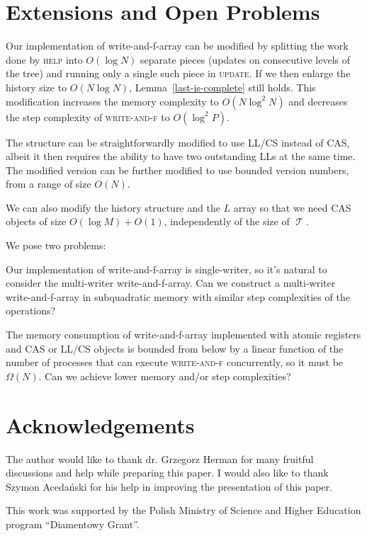 \documentclass[a4paper,11pt]{article}
\def\T{\ensuremath{\operatorname{\mathcal{T}}}\text{ }}
\newcommand{\fn}[1]{\textsc{#1}}
\begin{document}
\section{Extensions and Open Problems}

Our implementation of write-and-f-array can be modified by splitting the work done by \fn{help} into $O(\log N)$ separate pieces (updates on consecutive levels of the tree) and running only a single such piece in \fn{update}.
If we then enlarge the history size to $O(N\log N)$, Lemma~\ref{last-is-complete} still holds. This modification increases the memory complexity to $O(N\log^2N)$ and decreases the step complexity of
\fn{write-and-f} to $O(\log^2P)$.

The structure can be straightforwardly modified to use LL/CS instead of CAS, albeit it then requires the ability to have two outstanding LLs at the same time. The modified version can be further modified to use
bounded version numbers, from a range of size $O(N)$.

We can also modify the history structure and the $L$ array so that we need CAS objects of size $O(\log M) + O(1)$, independently of the size of \T.

We pose two problems:

Our implementation of write-and-f-array is single-writer, so it's natural to consider the multi-writer write-and-f-array. Can we construct a multi-writer write-and-f-array in subquadratic memory with similar step complexities of the operations?

The memory consumption of write-and-f-array implemented with atomic registers and CAS or LL/CS objects is bounded from below by a linear function of the number of processes that can execute \fn{write-and-f} concurrently\cite{lowerbound}, so it must be $\Omega(N)$. Can we achieve lower memory and/or step complexities?

\section{Acknowledgements}
The author would like to thank dr. Grzegorz Herman for many fruitful discussions and help while preparing this paper. I would also like to thank Szymon Acedański for his help in improving the presentation of this paper.

This work was supported by the Polish Ministry of Science and Higher Education program ``Diamentowy Grant''.

\newpage
\end{document}
